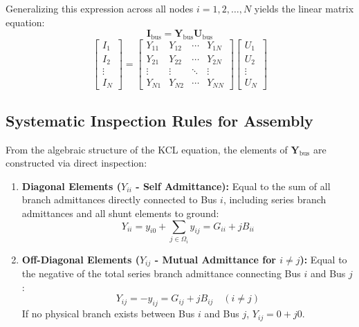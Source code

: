 \documentclass[12pt,a4paper,oneside]{report}
\begin{document}
Generalizing this expression across all nodes $i = 1, 2, \dots, N$ yields the linear matrix equation:
\begin{equation}
\mathbf{I}_{\text{bus}} = \mathbf{Y}_{\text{bus}} \mathbf{U}_{\text{bus}}
\end{equation}
\begin{equation}
\begin{bmatrix} I_1 \\ I_2 \\ \vdots \\ I_N \end{bmatrix} = \begin{bmatrix} Y_{11} & Y_{12} & \cdots & Y_{1N} \\ Y_{21} & Y_{22} & \cdots & Y_{2N} \\ \vdots & \vdots & \ddots & \vdots \\ Y_{N1} & Y_{N2} & \cdots & Y_{NN} \end{bmatrix} \begin{bmatrix} U_1 \\ U_2 \\ \vdots \\ U_N \end{bmatrix}
\end{equation}

\subsection{Systematic Inspection Rules for Assembly}
From the algebraic structure of the KCL equation, the elements of $\mathbf{Y}_{\text{bus}}$ are constructed via direct inspection:
\begin{enumerate}
    \item \textbf{Diagonal Elements ($Y_{ii}$ - Self Admittance):} Equal to the sum of all branch admittances directly connected to Bus $i$, including series branch admittances and all shunt elements to ground:
    \begin{equation}
    Y_{ii} = y_{i0} + \sum_{j \in \Omega_i} y_{ij} = G_{ii} + jB_{ii}
    \end{equation}
    \item \textbf{Off-Diagonal Elements ($Y_{ij}$ - Mutual Admittance for $i \neq j$):} Equal to the negative of the total series branch admittance connecting Bus $i$ and Bus $j$:
    \begin{equation}
    Y_{ij} = -y_{ij} = G_{ij} + jB_{ij} \quad (i \neq j)
    \end{equation}
    If no physical branch exists between Bus $i$ and Bus $j$, $Y_{ij} = 0 + j0$.
\end{enumerate}
\end{document}
